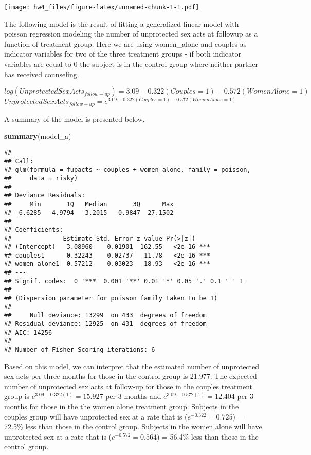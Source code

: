 \documentclass[]{article}
\newenvironment{Shaded}{\begin{snugshade}}{\end{snugshade}}
\newcommand{\KeywordTok}[1]{\textcolor[rgb]{0.13,0.29,0.53}{\textbf{{#1}}}}
\newcommand{\NormalTok}[1]{{#1}}
\begin{document}
\texttt{[image: hw4\_files/figure-latex/unnamed-chunk-1-1.pdf]}

The following model is the result of fitting a generalized linear model
with poisson regression modeling the number of unprotected sex acts at
followup as a function of treatment group. Here we are using
women\_alone and couples as indicator variables for two of the three
treatment groups - if both indicator variables are equal to 0 the
subject is in the control group where neither partner has received
counseling.

\(log(Unprotected Sex Acts_{follow-up}) = 3.09 - 0.322(Couples = 1) - 0.572(Women Alone = 1)\)
\(Unprotected Sex Acts_{follow-up} = e ^ {3.09 - 0.322(Couples = 1) - 0.572(Women Alone = 1)}\)

A summary of the model is presented below.

\begin{Shaded}
\begin{Highlighting}[]
\KeywordTok{summary}\NormalTok{(model_a)}
\end{Highlighting}
\end{Shaded}

\begin{verbatim}
## 
## Call:
## glm(formula = fupacts ~ couples + women_alone, family = poisson, 
##     data = risky)
## 
## Deviance Residuals: 
##     Min       1Q   Median       3Q      Max  
## -6.6285  -4.9794  -3.2015   0.9847  27.1502  
## 
## Coefficients:
##              Estimate Std. Error z value Pr(>|z|)    
## (Intercept)   3.08960    0.01901  162.55   <2e-16 ***
## couples1     -0.32243    0.02737  -11.78   <2e-16 ***
## women_alone1 -0.57212    0.03023  -18.93   <2e-16 ***
## ---
## Signif. codes:  0 '***' 0.001 '**' 0.01 '*' 0.05 '.' 0.1 ' ' 1
## 
## (Dispersion parameter for poisson family taken to be 1)
## 
##     Null deviance: 13299  on 433  degrees of freedom
## Residual deviance: 12925  on 431  degrees of freedom
## AIC: 14256
## 
## Number of Fisher Scoring iterations: 6
\end{verbatim}

Based on this model, we can interpret that the estimated number of
unprotected sex acts per three months for those in the control group is
21.977. The expected number of unprotected sex acts at follow-up for
those in the couples treatment group is \(e^{3.09-0.322(1)}= 15.927\)
per 3 months and \(e^{3.09-0.572(1)} = 12.404\) per 3 months for those
in the the women alone treatment group. Subjects in the couples group
will have unprotected sex at a rate that is (\(e^{-0.322}=0.725\)) =
72.5\% less than those in the control group. Subjects in the women alone
will have unprotected sex at a rate that is (\(e^{-0.572}=0.564\)) =
56.4\% less than those in the control group.
\end{document}
